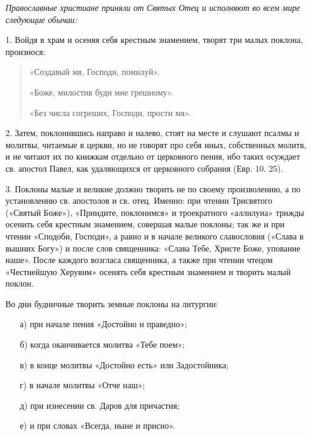 

\label{_o-molitve}

 

 





\itshape Православные христиане приняли от Святых Отец и исполняют во всем мире следующие обычаи: \normalfont{}



1. Войдя в храм и осеняя себя крестным знамением, творят три малых поклона, произнося:

\begin{quote}\bfseries 

«Создавый мя, Господи, помилуй». 

«Боже, милостив буди мне грешному». 

«Без числа согреших, Господи, прости мя».

\normalfont{}
\end{quote}


2. Затем, поклонившись направо и налево, стоят на месте и слушают псалмы и молитвы, читаемые в церкви, но не говорят про себя иных, собственных молитв, и не читают их по книжкам отдельно от церковного пения, ибо таких осуждает св. апостол Павел, как удаляющихся от церковного собрания (Евр. 10. 25). 



3. Поклоны малые и великие должно творить не по своему произволению, а по установлению св. апостолов и св. отец. Именно: при чтении Трисвятого («Святый Боже»), «Приидите, поклонимся» и троекратного «аллилуиа» трижды осенить себя крестным знамением, совершая малые поклоны; так же и при чтении «Сподоби, Господи», а равно и в начале великого славословия («Слава в вышних Богу») и после слов священника: «Слава Тебе, Христе Боже, упование наше». После каждого возгласа священника, а также при чтении чтецом «Честнейшую Херувим» осенять себя крестным знамением и творить малый поклон. 



Во дни будничные творить земные поклоны на литургии:


\begin{enumerate}

\item[а)] при начале пения «Достойно и праведно»; 

\item[б)] когда оканчивается молитва «Тебе поем»; 

\item[в)] в конце молитвы «Достойно есть» или Задостойника;

\item[г)] в начале молитвы «Отче наш»;

\item[д)] при изнесении св. Даров для причастия;

\item[е)] и при словах «Всегда, ныне и присно». 


\end{enumerate}


